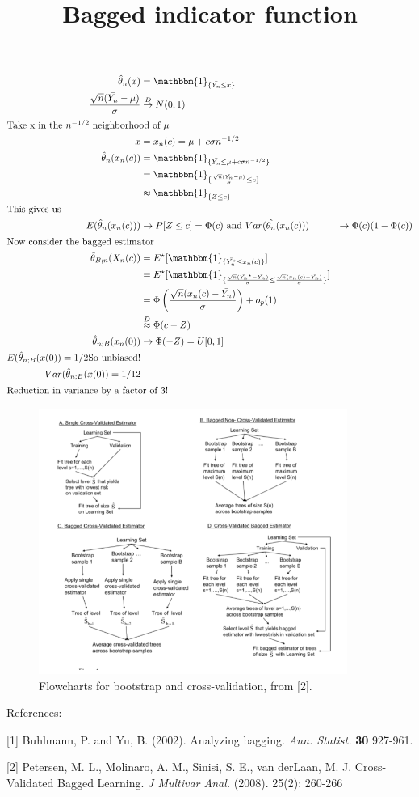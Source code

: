 \documentclass{article}
\title{Bagged indicator function}
\begin{document}
\maketitle
\begin{align*}
\hat{\theta}_n(x) &= \mathbbm{1}_{\{\bar{Y_n} \leq x\}}\\
\frac{\sqrt{n}(\bar{Y_n}- \mu)}{\sigma} &\overset{D}{\rightarrow} N(0,1)\\
\intertext{Take x in the $n^{-1/2}$ neighborhood of $\mu$}
x &= x_n(c) = \mu + c\sigma n^{-1/2}\\
\hat{\theta}_n(x_n(c)) &=\mathbbm{1}_{\{\bar{Y_n}\leq\mu+c\sigma n^{-1/2}\}}\\
&=\mathbbm{1}_{\{\frac{\sqrt{n}(\bar{Y_n} - \mu)}{\sigma}\leq c\}}\\
&\approx \mathbbm{1}_{\{Z\leq c\}}\\
\intertext{This gives us}
E(\hat{\theta}_n(x_n(c))) &\rightarrow P[Z\leq c] = \Phi(c)\,\, \text{and}\,\, Var(\hat{\theta_n}(x_n(c))) &\rightarrow \Phi(c)(1- \Phi(c))\\
\intertext{Now consider the bagged estimator}
\hat{\theta}_{B;n}(X_n(c)) &= E^{\star}[\mathbbm{1}_{\{\bar{Y_n^{\star}}\leq x_n(c)\}}]\\
&= E^{\star}[\mathbbm{1}_{\{\frac{\sqrt{n}(\bar{Y_n}^{\star} -\bar{Y_n})}{\sigma}\leq \frac{\sqrt{n}(x_n(c) - \bar{Y_n})}{\sigma}\}}]\\
&=\Phi\left(\frac{\sqrt{n}(x_n(c) - \bar{Y_n})}{\sigma}\right) + o_p(1)\\
&\overset{D}{\approx}\Phi(c-Z)\\
\hat{\theta}_{n;B}(x_n(0)) &\rightarrow \Phi(-Z) = U[0,1]\\
E(\hat{\theta}_{n;B}(x(0)) = 1/2 \text{So unbiased!}\\
Var(\hat{\theta}_{n;B}(x(0)) = 1/12\\ 
\intertext{Reduction in variance by a factor of 3!}
\end{align*}

\newpage
\begin{figure}
\includegraphics[width=0.9\textwidth]{PetersenFig1.png}
\caption{Flowcharts for bootstrap and cross-validation, from [2].}
\end{figure}

References:

[1] Buhlmann, P. and Yu, B. (2002). Analyzing bagging. \emph{Ann.
  Statist.} \textbf{30} 927-961.

[2] Petersen, M. L., Molinaro, A. M., Sinisi, S. E., van derLaan, M.
J. Cross-Validated Bagged Learning. \emph{J Multivar Anal.} (2008). 25(2): 260-266
\end{document}

